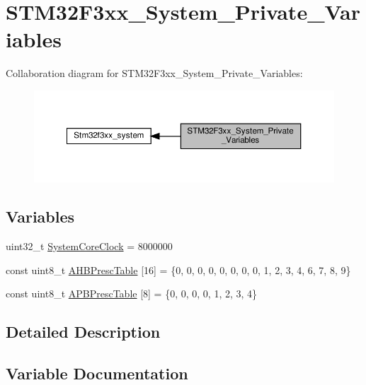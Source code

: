 \hypertarget{group__STM32F3xx__System__Private__Variables}{}\section{S\+T\+M32\+F3xx\+\_\+\+System\+\_\+\+Private\+\_\+\+Variables}
\label{group__STM32F3xx__System__Private__Variables}
Collaboration diagram for S\+T\+M32\+F3xx\+\_\+\+System\+\_\+\+Private\+\_\+\+Variables\+:\nopagebreak
\begin{figure}[H]
\begin{center}
\leavevmode
\includegraphics[width=350pt]{group__STM32F3xx__System__Private__Variables}
\end{center}
\end{figure}
\subsection*{Variables}
\begin{DoxyCompactItemize}
\item 
uint32\+\_\+t \hyperlink{group__STM32F3xx__System__Private__Variables_gaa3cd3e43291e81e795d642b79b6088e6}{System\+Core\+Clock} = 8000000
\item 
const uint8\+\_\+t \hyperlink{group__STM32F3xx__System__Private__Variables_ga6e1d9cd666f0eacbfde31e9932a93466}{A\+H\+B\+Presc\+Table} \mbox{[}16\mbox{]} = \{0, 0, 0, 0, 0, 0, 0, 0, 1, 2, 3, 4, 6, 7, 8, 9\}
\item 
const uint8\+\_\+t \hyperlink{group__STM32F3xx__System__Private__Variables_ga5b4f8b768465842cf854a8f993b375e9}{A\+P\+B\+Presc\+Table} \mbox{[}8\mbox{]} = \{0, 0, 0, 0, 1, 2, 3, 4\}
\end{DoxyCompactItemize}


\subsection{Detailed Description}


\subsection{Variable Documentation}
\mbox{\label{group__STM32F3xx__System__Private__Variables_ga6e1d9cd666f0eacbfde31e9932a93466}} 
